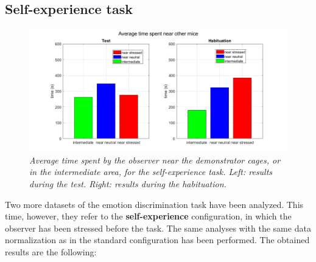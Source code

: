 \documentclass[12pt, a4paper]{article}
\begin{document}
\subsection{Self-experience task}


\begin{figure}[H]
	
	\begin{center}
		\hspace*{-1.4cm}
		\includegraphics[scale=.4]{times_self.png} 
	\end{center} 
	\caption{\textit{Average time spent by the observer near the demonstrator cages, or in the intermediate area, for the self-experience task. Left: results during the test. Right: results during the habituation.}}
	\label{times_self}
\end{figure}


Two more datasets of the emotion discrimination task have been analyzed. This time, however, they refer to the \textbf{self-experience} configuration, in which the observer has been stressed before the task. The same analyses with the same data normalization as in the standard configuration has been performed. The obtained results are the following:
\end{document}
